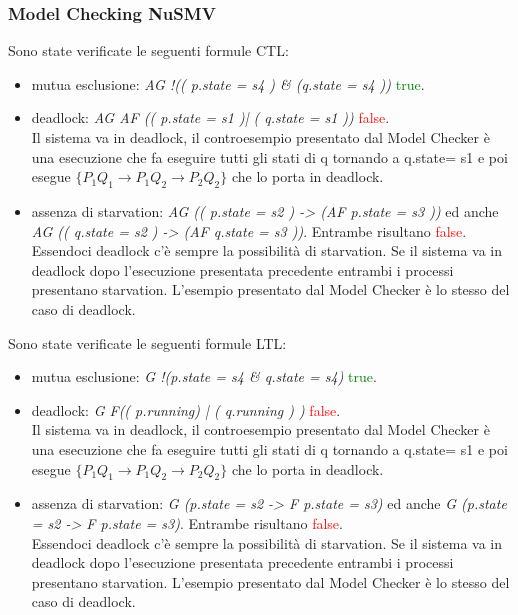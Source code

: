 \documentclass[a4paper]{article}
\begin{document}
\subsubsection{Model Checking NuSMV}
Sono state verificate le seguenti formule CTL:
\begin{itemize}
        \item mutua esclusione: \textit{AG !(( p.state = s4 ) \& (q.state = s4 ))} \textcolor{green}{true}.
        \item deadlock: \textit{AG AF (( p.state = s1 )| ( q.state = s1 ))} \textcolor{red}{false}.\\
		Il sistema va in deadlock, il controesempio presentato dal Model Checker è una esecuzione che fa eseguire tutti gli stati di q tornando a q.state= s1 e poi esegue $\{P_1Q_1 \rightarrow P_1Q_2 \rightarrow P_2Q_2\}$ che lo porta in deadlock.
        \item assenza di starvation: \textit{AG (( p.state = s2 ) -> (AF p.state = s3 ))} ed anche \textit{AG (( q.state = s2 ) -> (AF q.state = s3 ))}. Entrambe risultano \textcolor{red}{false}.\\
		Essendoci deadlock c'è sempre la possibilità di starvation. Se il sistema va in deadlock dopo l'esecuzione presentata precedente entrambi i processi presentano starvation.
		L'esempio presentato dal Model Checker è lo stesso del caso di deadlock.
\end{itemize}
Sono state verificate le seguenti formule LTL:
\begin{itemize}
        \item mutua esclusione: \textit{G !(p.state = s4 \& q.state = s4)} \textcolor{green}{true}.
        \item deadlock: \textit{G F(( p.running) | ( q.running ) )} \textcolor{red}{false}. \\
		Il sistema va in deadlock, il controesempio presentato dal Model Checker è una esecuzione che fa eseguire tutti gli stati di q tornando a q.state= s1 e poi esegue $\{P_1Q_1 \rightarrow P_1Q_2 \rightarrow P_2Q_2\}$ che lo porta in deadlock.
        \item assenza di starvation: \textit{G (p.state = s2 ->  F p.state = s3)} ed anche \textit{G (p.state = s2 ->  F p.state = s3)}. Entrambe risultano \textcolor{red}{false}.\\
		Essendoci deadlock c'è sempre la possibilità di starvation. Se il sistema va in deadlock dopo l'esecuzione presentata precedente entrambi i processi presentano starvation.
		L'esempio presentato dal Model Checker è lo stesso del caso di deadlock.
\end{itemize}
\end{document}
